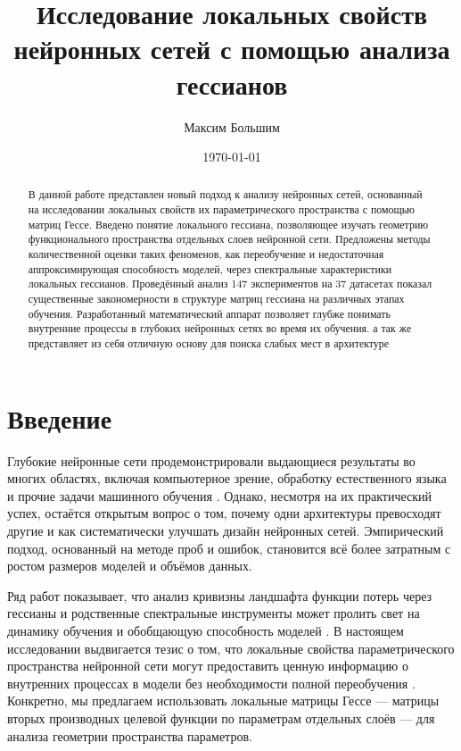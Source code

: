\documentclass[a4paper,12pt]{article}
\title{Исследование локальных свойств нейронных сетей с помощью анализа гессианов}
\author{Максим Большим}
\date{\today}
\begin{document}
\maketitle

\begin{abstract}
  В данной работе представлен новый подход к анализу нейронных сетей, основанный на исследовании локальных
  свойств их параметрического пространства с помощью матриц Гессе. Введено понятие локального гессиана,
  позволяющее изучать геометрию функционального пространства отдельных слоев нейронной сети. Предложены
  методы количественной оценки таких феноменов, как переобучение и недостаточная аппроксимирующая способность
  моделей, через спектральные характеристики локальных гессианов. Проведённый анализ 147 экспериментов на 37
  датасетах показал существенные закономерности в структуре матриц гессиана на различных этапах обучения.
  Разработанный математический аппарат позволяет глубже понимать внутренние процессы в глубоких нейронных
  сетях во время их обучения. а так же представляет из себя отличную основу для поиска слабых мест в архитектуре
\end{abstract}

\section{Введение}

Глубокие нейронные сети продемонстрировали выдающиеся результаты во многих областях, включая компьютерное
зрение, обработку естественного языка и прочие задачи машинного обучения \cite{lecun2015deep,
goodfellow2016deep}. Однако, несмотря на их практический успех, остаётся открытым вопрос о том, почему одни
архитектуры превосходят другие и как систематически улучшать дизайн нейронных сетей. Эмпирический подход,
основанный на методе проб и ошибок, становится всё более затратным с ростом размеров моделей и объёмов данных.

Ряд работ показывает, что анализ кривизны ландшафта функции потерь через гессианы и родственные спектральные
инструменты может пролить свет на динамику обучения и обобщающую способность моделей
\cite{sagun2017empirical, maheswaranathan2019universality, lee2019wide, arora2019finegrained}. В настоящем
исследовании выдвигается тезис о том, что локальные свойства параметрического пространства нейронной сети
могут предоставить ценную информацию о внутренних процессах в модели без необходимости полной переобучения
\cite{poole2016transient}. Конкретно, мы предлагаем использовать локальные матрицы Гессе — матрицы вторых
производных целевой функции по параметрам отдельных слоёв — для анализа геометрии пространства параметров.
\end{document}
